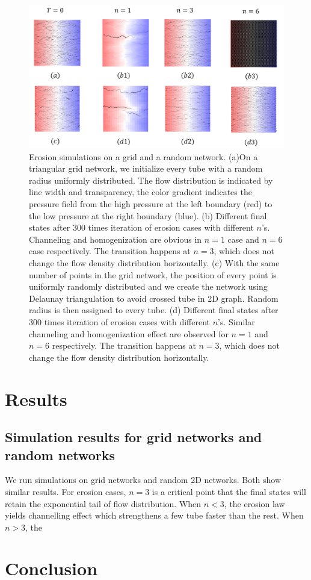 \documentclass[%
 reprint,
 amsmath,amssymb,
 aps,
]{revtex4-1}
\begin{document}
\newpage
\onecolumngrid
\begin{figure}[h]
    \includegraphics[width = 1\textwidth]{Figs/ErosionSim.png}
    \caption{Erosion  simulations on a grid and a random network. (a)On a triangular grid network, we initialize every tube with a random radius uniformly distributed. The flow distribution is indicated by line width and transparency, the color gradient indicates the pressure field from the high pressure at the left boundary (red) to the low pressure at the right boundary (blue). (b) Different final states after 300 times iteration of erosion cases with different $n$'s. Channeling and homogenization are obvious in $n=1$ case and $n=6$ case respectively. The transition happens at $n=3$, which does not change the flow density distribution horizontally. (c) With the same number of points in the grid network, the position of every point is uniformly randomly distributed and we create the network using Delaunay triangulation to avoid crossed tube in 2D graph. Random radius is then assigned to every tube. (d) Different final states after 300 times iteration of erosion cases with different $n$'s. Similar channeling and homogenization effect are observed for $n=1$ and $n=6$ respectively. The transition happens at $n=3$, which does not change the flow density distribution horizontally.    }
    \label{fig:ErosionFig}
\end{figure}

\twocolumngrid



\section{Results}
\subsection{Simulation results for grid networks and random networks}
We run simulations on grid networks and random 2D networks. Both show similar results. For erosion cases, $n=3$ is a critical point that the final states will retain the exponential tail of flow distribution. When $n<3$, the erosion law yields channelling effect which strengthens a few tube faster than the rest. When $n>3$, the 
\section{Conclusion}


\end{document}
